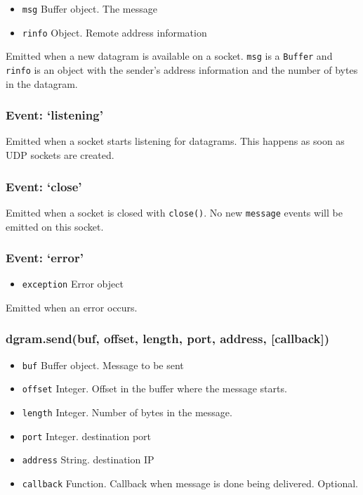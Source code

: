 \begin{itemize}
\item
  \texttt{msg} Buffer object. The message
\item
  \texttt{rinfo} Object. Remote address information
\end{itemize}

Emitted when a new datagram is available on a socket. \texttt{msg} is a
\texttt{Buffer} and \texttt{rinfo} is an object with the sender's
address information and the number of bytes in the datagram.

\subsubsection{Event: `listening'}

Emitted when a socket starts listening for datagrams. This happens as
soon as UDP sockets are created.

\subsubsection{Event: `close'}

Emitted when a socket is closed with \texttt{close()}. No new
\texttt{message} events will be emitted on this socket.

\subsubsection{Event: `error'}

\begin{itemize}
\item
  \texttt{exception} Error object
\end{itemize}

Emitted when an error occurs.

\subsubsection{dgram.send(buf, offset, length, port, address,
{[}callback{]})}

\begin{itemize}
\item
  \texttt{buf} Buffer object. Message to be sent
\item
  \texttt{offset} Integer. Offset in the buffer where the message
  starts.
\item
  \texttt{length} Integer. Number of bytes in the message.
\item
  \texttt{port} Integer. destination port
\item
  \texttt{address} String. destination IP
\item
  \texttt{callback} Function. Callback when message is done being
  delivered. Optional.
\end{itemize}

